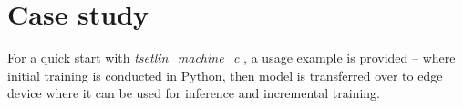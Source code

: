 \documentclass[english]{aghengthesis} %
\newcommand*{\LibraryName}{\emph{tsetlin\_machine\_c }}
\begin{document}













\section{Case study}
For a quick start with \LibraryName, a usage example is provided -- where initial training is conducted in Python, then model is transferred over to edge device where it can be used for inference and incremental training.
\end{document}
